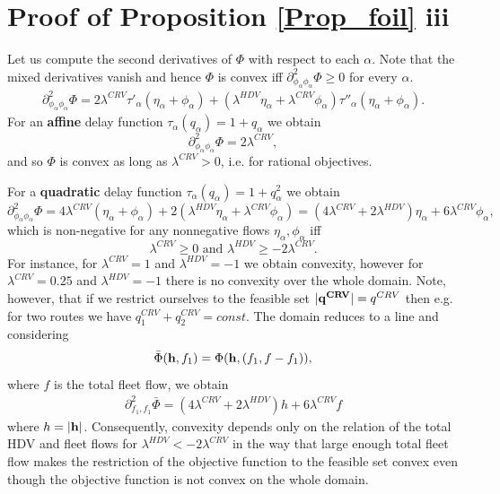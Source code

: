 \documentclass[a4paper,11pt]{article}
\begin{document}
\section{Proof of Proposition \ref{Prop_foil} iii}
\label{Sec_convconc}
Let us compute the second derivatives of $\Phi$ with respect to each $\alpha$. Note that the mixed derivatives vanish and hence $\Phi$ is convex iff $\partial^2_{\phi_\alpha \phi_\alpha} \Phi \ge 0$ for every $\alpha$.
\begin{eqnarray*}
\partial^2_{\phi_\alpha \phi_\alpha} \Phi = 2\lambda^{CRV} \tau' _\alpha (\eta_\alpha + \phi_\alpha) + (\lambda^{HDV}\eta_\alpha + \lambda^{CRV} \phi_\alpha) \tau'' _\alpha(\eta_\alpha + \phi_\alpha).
\end{eqnarray*}
For an {\bf affine} delay function $\tau_\alpha (q_\alpha) = 1 + q_\alpha$ we obtain
\begin{equation*}
\partial^2_{\phi_\alpha \phi_\alpha} \Phi = 2\lambda^{CRV},
\end{equation*}
and so $\Phi$ is convex as long as $\lambda^{CRV}>0$, i.e. for rational objectives. 

\noindent For a {\bf quadratic} delay function $\tau_\alpha (q_\alpha) = 1 + q_\alpha^2$ we obtain
\begin{equation*}
\partial^2_{\phi_\alpha \phi_\alpha} \Phi = 4\lambda^{CRV}(\eta_\alpha + \phi_\alpha) + 2(\lambda^{HDV} \eta_\alpha + \lambda^{CRV}\phi_\alpha)  = (4\lambda^{CRV} + 2\lambda^{HDV})\eta_{\alpha} + 6\lambda^{CRV} \phi_\alpha,
\end{equation*}
which is non-negative for any nonnegative flows $\eta_\alpha, \phi_\alpha$ iff $$\lambda^{CRV} \ge 0 \mbox{ and } \lambda^{HDV} \ge -2\lambda^{CRV}.$$ For instance, for $\lambda^{CRV} = 1$ and $\lambda^{HDV} = -1$ we obtain convexity, however for $\lambda^{CRV} = 0.25$ and $\lambda^{HDV} = -1$ there is no convexity over the whole domain.  
Note, however, that if we restrict ourselves to the feasible set $|\bold{q^{CRV}}| = q^{CRV}$ then e.g. for two routes we have $q^{CRV}_1 + q^{CRV}_2 = const$. The domain reduces to a line and considering $$\bar{\Phi}(\bold{h}, f_1) = \Phi(\bold{h}, (f_1, f-f_1)),$$ where $f$ is the total fleet flow, we obtain
\begin{eqnarray*}
\partial^2_{f_1,f_1} \bar{\Phi} = (4\lambda^{CRV} + 2\lambda^{HDV}) h + 6\lambda^{CRV} f
\end{eqnarray*} 
where $h = |\bold{h}|$. Consequently, convexity depends only on the relation of the total HDV and fleet flows for $\lambda^{HDV}<-2\lambda^{CRV}$ in the way that large enough total fleet flow makes the restriction of the objective function to the feasible set convex even though the objective function is not convex on the whole domain.  
\end{document}
